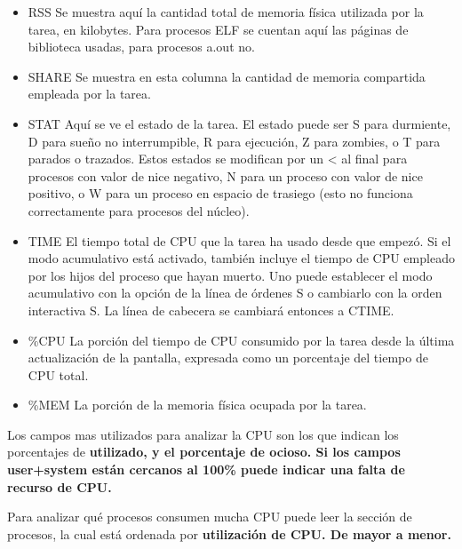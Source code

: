 \documentclass[12pt]{article}
\begin{document}
\begin{itemize}
\item       RSS  Se muestra aquí la cantidad total de memoria física utilizada  por
            la  tarea,  en  kilobytes.  Para  procesos ELF se cuentan aquí las
            páginas de biblioteca usadas, para procesos a.out no.

\item       SHARE
            Se muestra en esta  columna  la  cantidad  de  memoria  compartida
            empleada por la tarea.

\item       STAT Aquí  se  ve  el  estado  de  la tarea. El estado puede ser S para
            durmiente, D para sueño no interrumpible, R para ejecución, Z para
            zombies,  o  T para parados o trazados. Estos estados se modifican
            por un < al final para procesos con valor de nice negativo, N para
            un  proceso  con  valor  de  nice positivo, o W para un proceso en
            espacio de trasiego (esto no funciona correctamente para  procesos
            del núcleo).

\item       TIME El tiempo total de CPU que la tarea ha usado desde que empezó.  Si
            el  modo  acumulativo  está activado, también incluye el tiempo de
            CPU empleado por los hijos del proceso que hayan muerto. Uno puede
            establecer  el  modo  acumulativo  con  la  opción  de la línea de
            órdenes S o cambiarlo con la orden interactiva  S.   La  línea  de
            cabecera se cambiará entonces a CTIME.

\item       \%CPU La  porción  del  tiempo  de  CPU  consumido por la tarea desde la
            última actualización de la pantalla, expresada como un  porcentaje
            del tiempo de CPU total.


\item       \%MEM La porción de la memoria física ocupada por la tarea.

\end{itemize}


Los campos mas utilizados para analizar la CPU son los que indican los porcentajes de \bf{utilizado},
y el porcentaje de \bf{ocioso}. Si los campos user+system están cercanos al 100\% puede indicar una falta de recurso de CPU.

Para analizar qué procesos consumen mucha CPU puede leer 
la sección de procesos, la cual está ordenada por \bf{utilización de CPU}. De mayor a menor.
\end{document}
